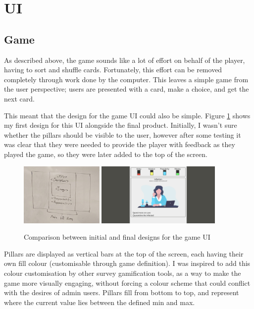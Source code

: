 \section{UI}

\subsection{Game}
As described above, the game sounds like a lot of effort on behalf of the player, having to sort and shuffle cards. Fortunately, this effort can be removed completely through work done by the computer. This leaves a simple game from the user perspective; users are presented with a card, make a choice, and get the next card.

This meant that the design for the game UI could also be simple. Figure \ref{fig:game_comp} shows my first design for this UI alongside the final product. Initially, I wasn't sure whether the pillars should be visible to the user, however after some testing it was clear that they were needed to provide the player with feedback as they played the game, so they were later added to the top of the screen.

\begin{figure}[!h]
	\centering
	\includegraphics[width=0.36\textwidth]{./images/design/game_drawing.jpg}
	\includegraphics[width=0.54\textwidth]{./images/design/game.png}
	\caption{Comparison between initial and final designs for the game UI}
	\label{fig:game_comp}
\end{figure}

Pillars are displayed as vertical bars at the top of the screen, each having their own fill colour (customisable through game definition). I was inspired to add this colour customisation by other survey gamification tools, as a way to make the game more visually engaging, without forcing a colour scheme that could conflict with the desires of admin users. Pillars fill from bottom to top, and represent where the current value lies between the defined min and max.

